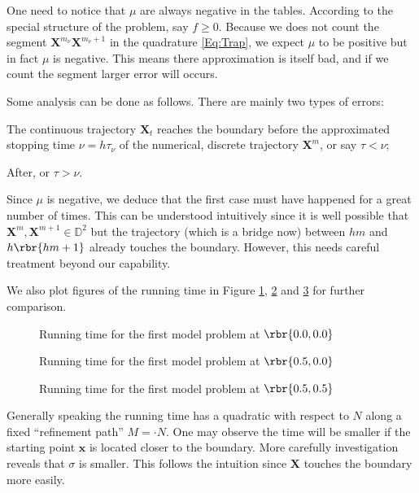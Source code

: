 \documentclass[english, nochinese]{pnote}
\begin{document}
One need to notice that $\mu$ are always negative in the tables. According to the special structure of the problem, say $ f \ge 0 $. Because we does not count the segment $ \bm{X}^{m_{\nu}} \bm{X}^{ m_{\nu} + 1 } $ in the quadrature \ref{Eq:Trap}, we expect $\mu$ to be positive but in fact $\mu$ is negative. This means there approximation is itself bad, and if we count the segment larger error will occurs.

Some analysis can be done as follows. There are mainly two types of errors:
\begin{partlist}
\item The continuous trajectory $\bm{X}_t$ reaches the boundary before the approximated stopping time $ \nu = h \tau_{\nu} $ of the numerical, discrete trajectory $\bm{X}^m$, or say $ \tau < \nu $;
\item After, or $ \tau > \nu $.
\end{partlist}
Since $\mu$ is negative, we deduce that the first case must have happened for a great number of times. This can be understood intuitively since it is well possible that $ \bm{X}^m, \bm{X}^{ m + 1 } \in \mathbb{D}^2 $ but the trajectory (which is a bridge now) between $ h m $ and $ h \rbr{ h m + 1 } $ already touches the boundary. However, this needs careful treatment beyond our capability.

We also plot figures of the running time in Figure \ref{Fig:EMTime11}, \ref{Fig:EMTime12} and \ref{Fig:EMTime13} for further comparison.

\begin{figure}[htbp]
\centering

\caption{Running time for the first model problem at $ \rbr{ 0.0, 0.0 } $}
\label{Fig:EMTime11}
\end{figure}

\begin{figure}[htbp]
\centering

\caption{Running time for the first model problem at $ \rbr{ 0.5, 0.0 } $}
\label{Fig:EMTime12}
\end{figure}

\begin{figure}[htbp]
\centering

\caption{Running time for the first model problem at $ \rbr{ 0.5, 0.5 } $}
\label{Fig:EMTime13}
\end{figure}

Generally speaking the running time has a quadratic with respect to $N$ along a fixed ``refinement path'' $ M = \cdot N $. One may observe the time will be smaller if the starting point $\bm{x}$ is located closer to the boundary. More carefully investigation reveals that $\sigma$ is smaller. This follows the intuition since $\bm{X}$ touches the boundary more easily.
\end{document}
